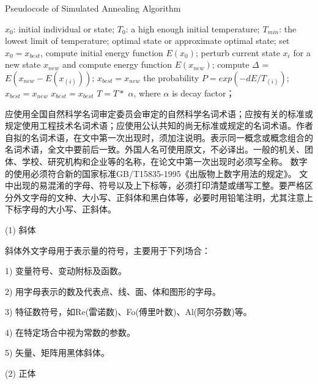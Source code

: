 \begin{algorithm}[h]  
	\caption{Pseudocode of Simulated Annealing Algorithm} %
	\begin{algorithmic}[1]   
	  \Require      
		$x_0$: initial individual or state;     
		$T_0$: a high enough initial temperature;      
		$T_{min}$: the lowest limit of temperature;    
      \Ensure       
		optimal state or approximate optimal state;       
		\State set $x_0 = x_{best}$, compute initial energy function $E(x_0)$;       
		\State perturb current state $x_i$ for a new state $x_{new}$ and compute energy function $E(x_{new})$;      
		\State compute $\Delta$ = $E(x_{new}-E(x_{(i)}))$;      
		 \State $x_{best} = x_{new}$      
		\Else \State the probability $P = exp(-dE/T_{(i)})$;      
		\State $x_{best} = x_{new}$      
		\Else \State $x_{best} = x_{best}$      
		\EndIf     
       \EndIf     
	   \EndFor      
		\State $T = T * $ $ \alpha$, where $\alpha$ is decay factor；
	  \EndWhile  
	\end{algorithmic}
\end{algorithm}
应使用全国自然科学名词审定委员会审定的自然科学名词术语；应按有关的标准或规定使用工程技术名词术语；应使用公认共知的尚无标准或规定的名词术语。作者自拟的名词术语，在文中第一次出现时，须加注说明。表示同一概念或概念组合的名词术语，全文中要前后一致。外国人名可使用原文，不必译出。一般的机关、团体、学校、研究机构和企业等的名称，在论文中第一次出现时必须写全称。
数字的使用必须符合新的国家标准GB/T15835-1995《出版物上数字用法的规定》。
文中出现的易混淆的字母、符号以及上下标等，必须打印清楚或缮写工整。要严格区分外文字母的文种、大小写、正斜体和黑白体等，必要时用铅笔注明，尤其注意上下标字母的大小写、正斜体。\par
(1) 斜体\par
斜体外文字母用于表示量的符号，主要用于下列场合：\par
1) 变量符号、变动附标及函数。\par
2) 用字母表示的数及代表点、线、面、体和图形的字母。\par
3) 特征数符号，如Re(雷诺数)、Fo(傅里叶数)、Al(阿尔芬数)等。\par
4) 在特定场合中视为常数的参数。\par
5) 矢量、矩阵用黑体斜体。\par
(2) 正体\par
